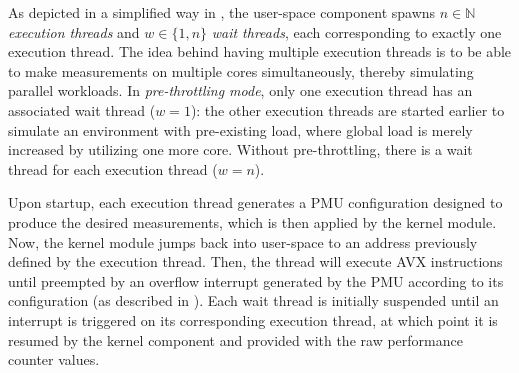 As depicted in a simplified way in , the user-space component spawns $n\in\mathbb{N}$ \textit{execution threads} and $w\in\{1,n\}$ \textit{wait threads}, each corresponding to exactly one execution thread. The idea behind having multiple execution threads is to be able to make measurements on multiple cores simultaneously, thereby simulating parallel workloads. In \emph{pre-throttling mode}, only one execution thread has an associated wait thread ($w=1$): the other execution threads are started earlier to simulate an environment with pre-existing load, where global load is merely increased by utilizing one more core. Without pre-throttling, there is a wait thread for each execution thread ($w=n$).

Upon startup, each execution thread generates a \gls{PMU} configuration designed to produce the desired measurements, which is then applied by the kernel module. Now, the kernel module jumps back into user-space to an address previously defined by the execution thread. Then, the thread will execute \gls{AVX} instructions until preempted by an overflow interrupt generated by the \gls{PMU} according to its configuration (as described in ). Each wait thread is initially suspended until an interrupt is triggered on its corresponding execution thread, at which point it is resumed by the kernel component and provided with the raw performance counter values.

